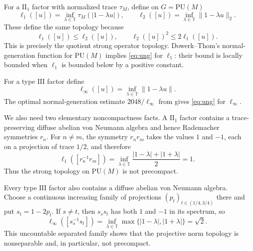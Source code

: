 \documentclass[11pt]{article}
\newcommand{\T}{\mathbb T}
\newcommand{\PU}{\mathrm{PU}}
\begin{document}
For a $\mathrm{II}_1$ factor with normalized trace $\tau_M$, define on
$G=\PU(M)$
\[
 \ell_1([u])=\inf_{\lambda\in\T}\tau_M(|1-\lambda u|),\qquad
 \ell_2([u])=\inf_{\lambda\in\T}\|1-\lambda u\|_2.
\]
These define the same topology because
\begin{equation}\label{eq:normcompare}
                \ell_1([u])\leq\ell_2([u]),
        \qquad \ell_2([u])^2\leq2\ell_1([u]).
\end{equation}
This is precisely the quotient strong operator topology.  Dowerk--Thom's
normal-generation function for $\PU(M)$ \cite[Theorem~1.3]{DTfinite}
implies \eqref{eq:ung} for $\ell_1$: their bound is locally bounded when
$\ell_1$ is bounded below by a positive constant.

For a type $\mathrm{III}$ factor define
\[
                  \ell_\infty([u])
        =\inf_{\lambda\in\T}\|1-\lambda u\|.
\]
The optimal normal-generation estimate
$2048/\ell_\infty$ from \cite[Theorem~1.3]{DTinfinite} gives
\eqref{eq:ung} for $\ell_\infty$.

We also need two elementary noncompactness facts.  A $\mathrm{II}_1$ factor
contains a trace-preserving diffuse abelian von Neumann algebra and hence
Rademacher symmetries $r_n$.  For $n\neq m$, the symmetry $r_nr_m$ takes the
values $1$ and $-1$, each on a projection of trace $1/2$, and therefore
\[
 \ell_1([r_n^{-1}r_m])
 =\inf_{\lambda\in\T}\frac{|1-\lambda|+|1+\lambda|}{2}=1.
\]
Thus the strong topology on $\PU(M)$ is not precompact.

Every type $\mathrm{III}$ factor also contains a diffuse abelian von Neumann
algebra.  Choose a continuous increasing family of projections
$(p_t)_{t\in(1/4,3/4)}$ there and put $s_t=1-2p_t$.  If $s\neq t$, then
$s_s s_t$ has both $1$ and $-1$ in its spectrum, so
\[
 \ell_\infty([s_s^{-1}s_t])
 =\inf_{\lambda\in\T}\max\{|1-\lambda|,|1+\lambda|\}=\sqrt2.
\]
This uncountable separated family shows that the projective norm topology is
nonseparable and, in particular, not precompact.
\end{document}
